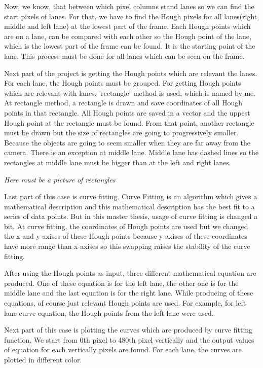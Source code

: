 Now, we know, that between which pixel columns stand lanes so we can find the start pixels of lanes. For that, we have to find the Hough pixels for all lanes(right, middle and left lane) at the lowest part of the frame. Each Hough points which are on a lane, can be compared with each other so the Hough point of the lane, which is the lowest part of the frame can be found. It is the starting point of the lane. This process must be done for all lanes which can be seen on the frame.

Next part of the project is getting the Hough points which are relevant the lanes. For each lane, the Hough points must be grouped. For getting Hough points which are relevant with lanes, 'rectangle' method is used, which is named by me. At rectangle method, a rectangle is drawn and save coordinates of all Hough points in that rectangle. All Hough points are saved in a vector and the uppest Hough point at the rectangle must be found. From that point, another rectangle must be drawn but the size of rectangles are going to progressively smaller. Because the objects are going to seem smaller when they are far away from the camera. There is an exception at middle lane. Middle lane has dashed lines so the rectangles at middle lane must be bigger than at the left and right lanes.

\emph{\color{blue} Here must be a picture of rectangles}

Last part of this case is curve fitting. Curve Fitting is an algorithm which gives a mathematical description and this mathematical description has the best fit to a series of data points. But in this master thesis, usage of curve fitting is changed a bit. At curve fitting, the coordinates of Hough points are used but we changed the x and y axises of these Hough points because y-axises of these coordinates have more range than x-axises so this swapping raises the stability of the curve fitting.

After using the Hough points as input, three different mathematical equation are produced. One of these equation is for the left lane, the other one is for the middle lane and the last equation is for the right lane. While producing of these equations, of course just relevant Hough points are used. For example, for left lane curve equation, the Hough points from the left lane were used. 
 
Next part of this case is plotting the curves which are produced by curve fitting function. We start from 0th pixel to 480th pixel vertically and the output values of equation for each vertically pixels are found. For each lane, the curves are plotted in different color.  
 

